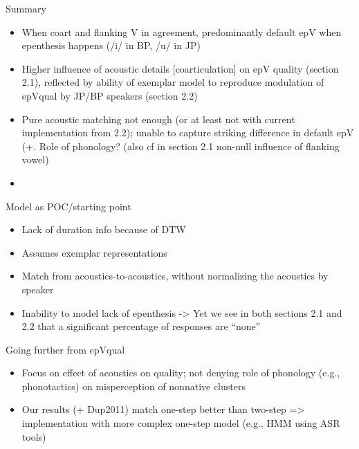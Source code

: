 Summary
\begin{itemize}
\item When coart and flanking V in agreement, predominantly default epV when epenthesis happens (/i/ in BP, /u/ in JP)  
\item Higher influence of acoustic details [coarticulation] on epV quality (section 2.1), reflected by ability of exemplar model to reproduce modulation of epVqual by JP/BP speakers (section 2.2) 
\item Pure acoustic matching not enough (or at least not with current implementation from 2.2); unable to capture striking difference in default epV (+. Role of phonology? (also cf in section 2.1 non-null influence of flanking vowel)
\item 
\end{itemize}


Model as POC/starting point

\begin{itemize}
\item Lack of duration info because of DTW
\item Assumes exemplar representations
\item Match from acoustics-to-acoustics, without normalizing the acoustics by speaker
\item Inability to model lack of epenthesis -> Yet we see in both sections 2.1 and 2.2 that a significant percentage of responses are ``none''
\end{itemize}

Going further from epVqual 

\begin{itemize}
\item Focus on effect of acoustics on quality; not denying role of phonology (e.g., phonotactics) on misperception of nonnative clusters 
\item Our results (+ Dup2011) match one-step better than two-step => implementation with more complex one-step model (e.g., HMM using ASR tools)
\end{itemize}


